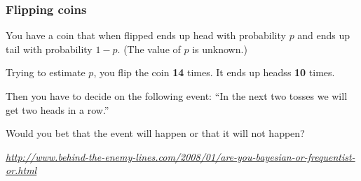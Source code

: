 \documentclass[t]{beamer}
\newcommand\smallgray[1]{\textcolor{gray}{\small\it #1}}
\newcommand\prevwork[1]{\smallgray{#1}}
\begin{document}
\begin{frame}

  \note{

  }
\end{frame}

\begin{frame}
  \frametitle{Flipping coins}

  You have a coin that when flipped ends up head with probability $p$
  and ends up tail with probability $1-p$. (The value of $p$ is
  unknown.)

  Trying to estimate $p$, you flip the coin \textbf{14} times. It ends
  up headss \textbf{10} times.

  Then you have to decide on the following event: ``In the next two
  tosses we will get two heads in a row.''

  Would you bet that the event will happen or that it will not happen?

  \vfill
  \prevwork{\url{http://www.behind-the-enemy-lines.com/2008/01/are-you-bayesian-or-frequentist-or.html}}

  \note{

  }
\end{frame}
\end{document}

